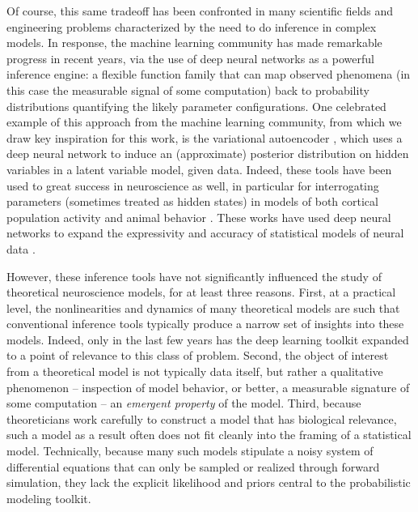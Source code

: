 \documentclass[11pt]{article}
\begin{document}
Of course, this same tradeoff has been confronted in many scientific fields and engineering problems characterized by the need to do inference in complex models.  
In response, the machine learning community has made remarkable progress in recent years, via the use of deep neural networks as a powerful inference engine: a flexible function family that can map observed phenomena (in this case the measurable signal of some computation) back to probability distributions quantifying the likely parameter configurations.  
One celebrated example of this approach from the machine learning community, from which we draw key inspiration for this work, is the variational autoencoder \cite{kingma2013auto, rezende2014stochastic}, which uses a deep neural network to induce an (approximate) posterior distribution on hidden variables in a latent variable model, given data. 
Indeed, these tools have been used to great success in neuroscience as well, in particular for interrogating parameters (sometimes treated as hidden states) in models of both cortical population activity \cite{gao2016linear, zhao2017recursive, barello2018sparse, pandarinath2018inferring} and animal behavior \cite{wiltschko2015mapping, johnson2016composing, batty2019behavenet}. 
These works have used deep neural networks to expand the expressivity and accuracy of statistical models of neural data \cite{paninski2018neural}. 

However, these inference tools have not significantly influenced the study of theoretical neuroscience models, for at least three reasons.  
First, at a practical level, the nonlinearities and dynamics of many theoretical models are such that conventional inference tools typically produce a narrow set of insights into these models.  
Indeed, only in the last few years has the deep learning toolkit expanded to a point of relevance to this class of problem.
Second, the object of interest from a theoretical model is not typically data itself, but rather a qualitative phenomenon -- inspection of model behavior, or better, a measurable signature of some computation -- an \emph{emergent property} of the model.  
Third, because theoreticians work carefully to construct a model that has biological relevance, such a model as a result often does not fit cleanly into the framing of a statistical model.  
Technically, because many such models stipulate a noisy system of differential equations that can only be sampled or realized through forward simulation, they lack the explicit likelihood and priors central to the probabilistic modeling toolkit.  
\end{document}
